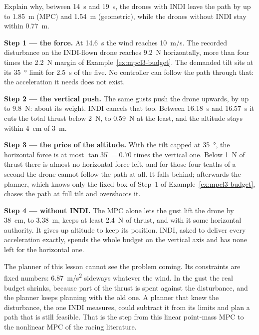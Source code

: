 \begin{example}
\label{ex:mpcl3-edge}
Explain why, between \SI{14}{s} and \SI{19}{s}, the drones with INDI leave the path by up to \SI{1.85}{m} (MPC) and \SI{1.54}{m} (geometric), while the drones without INDI stay within \SI{0.77}{m}.

\textbf{Step 1 — the force.} At \SI{14.6}{s} the wind reaches \SI{10}{m/s}. The recorded disturbance on the INDI-flown drone reaches \SI{9.2}{N} horizontally, more than four times the \SI{2.2}{N} margin of Example~\ref{ex:mpcl3-budget}. The demanded tilt sits at its \SI{35}{\degree} limit for \SI{2.5}{s} of the five. No controller can follow the path through that: the acceleration it needs does not exist.

\textbf{Step 2 — the vertical push.} The same gusts push the drone upwards, by up to \SI{9.8}{N}: about its weight. INDI cancels that too. Between \SI{16.18}{s} and \SI{16.57}{s} it cuts the total thrust below \SI{2}{N}, to \SI{0.59}{N} at the least, and the altitude stays within \SI{4}{cm} of \SI{3}{m}.

\textbf{Step 3 — the price of the altitude.} With the tilt capped at \SI{35}{\degree}, the horizontal force is at most $\tan 35^\circ = 0.70$ times the vertical one. Below \SI{1}{N} of thrust there is almost no horizontal force left, and for those four tenths of a second the drone cannot follow the path at all. It falls behind; afterwards the planner, which knows only the fixed box of Step~1 of Example~\ref{ex:mpcl3-budget}, chases the path at full tilt and overshoots it.

\textbf{Step 4 — without INDI.} The MPC alone lets the gust lift the drone by \SI{38}{cm}, to \SI{3.38}{m}, keeps at least \SI{2.4}{N} of thrust, and with it some horizontal authority. It gives up altitude to keep its position. INDI, asked to deliver every acceleration exactly, spends the whole budget on the vertical axis and has none left for the horizontal one.
\end{example}

The planner of this lesson cannot see the problem coming. Its constraints are fixed numbers: \SI{6.87}{m/s^2} sideways whatever the wind. In the gust the real budget shrinks, because part of the thrust is spent against the disturbance, and the planner keeps planning with the old one. A planner that knew the disturbance, the one INDI measures, could subtract it from its limits and plan a path that is still feasible. That is the step from this linear point-mass MPC to the nonlinear MPC of the racing literature.

